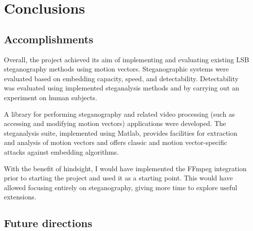 \documentclass[12pt,british,twoside,notitlepage,usenames,dvipsnames,hypens,final]{report}
\numberwithin{equation}{section}
\numberwithin{figure}{section}
\begin{document}
\cleardoublepage
\chapter{Conclusions}

\section{Accomplishments}

Overall, the project achieved its aim of implementing and evaluating existing LSB steganography methods using motion vectors. Steganographic systems were evaluated based on embedding capacity, speed, and detectability. Detectability was evaluated using implemented steganalysis methods and by carrying out an experiment on human subjects.

A library for performing steganography and related video processing (such as accessing and modifying motion vectors) applications were developed. The steganalysis suite, implemented using Matlab, provides facilities for extraction and analysis of motion vectors and offers classic and motion vector-specific attacks against embedding algorithms.

With the benefit of hindsight, I would have implemented the FFmpeg integration prior to starting the project and used it as a starting point. This would have allowed focusing entirely on steganography, giving more time to explore useful extensions.

\section{Future directions}
\end{document}
